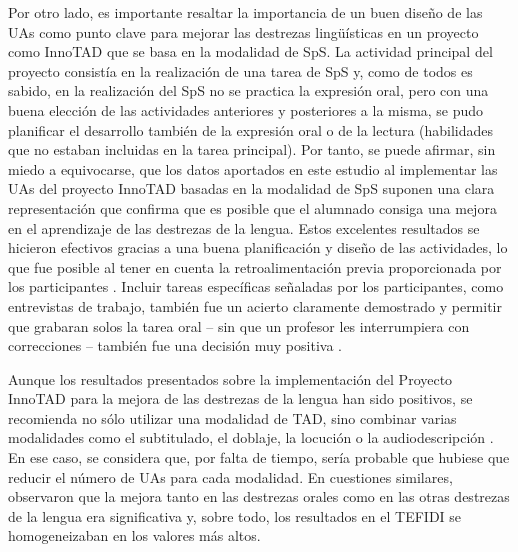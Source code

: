 \documentclass[spanish]{textolivre}
\begin{document}
Por otro lado, es importante resaltar la importancia de un buen diseño de las UAs como punto clave para mejorar las destrezas lingüísticas en un proyecto como InnoTAD que se basa en la modalidad de SpS. La actividad principal del proyecto consistía en la realización de una tarea de SpS y, como de todos es sabido, en la realización del SpS no se practica la expresión oral, pero con una buena elección de las actividades anteriores y posteriores a la misma, se pudo planificar el desarrollo también de la expresión oral o de la lectura (habilidades que no estaban incluidas en la tarea principal). Por tanto, se puede afirmar, sin miedo a equivocarse, que los datos aportados en este estudio al implementar las UAs del proyecto InnoTAD basadas en la modalidad de SpS suponen una clara representación que confirma que es posible que el alumnado consiga una mejora en el aprendizaje de las destrezas de la lengua. Estos excelentes resultados se hicieron efectivos gracias a una buena planificación y diseño de las actividades, lo que fue posible al tener en cuenta la retroalimentación previa proporcionada por los participantes \cite{bygate2009teaching}. Incluir tareas específicas señaladas por los participantes, como entrevistas de trabajo, también fue un acierto claramente demostrado y permitir que grabaran solos la tarea oral – sin que un profesor les interrumpiera con correcciones – también fue una decisión muy positiva \cite{romaine2005}.

Aunque los resultados presentados sobre la implementación del Proyecto InnoTAD para la mejora de las destrezas de la lengua han sido positivos, se recomienda no sólo utilizar una modalidad de TAD, sino combinar varias modalidades como el subtitulado, el doblaje, la locución o la audiodescripción \cite{talavan2024}. En ese caso, se considera que, por falta de tiempo, sería probable que hubiese que reducir el número de UAs para cada modalidad. En cuestiones similares, \textcite{fernandez-costales2023} observaron que la mejora tanto en las destrezas orales como en las otras destrezas de la lengua era significativa y, sobre todo, los resultados en el TEFIDI se homogeneizaban en los valores más altos.
\end{document}
